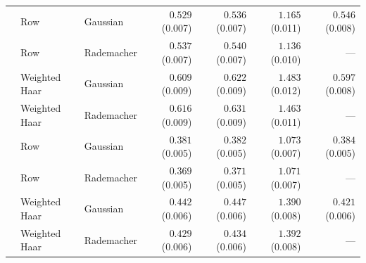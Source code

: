 \begin{tabular}{@{}rllrrrr@{}}
\addlinespace[3pt]
256 & Row & Gaussian & $0.529$ (0.007) & $0.536$ (0.007) & $1.165$ (0.011) & $0.546$ (0.008) \\
 & Row & Rademacher & $0.537$ (0.007) & $0.540$ (0.007) & $1.136$ (0.010) & --- \\
 & Weighted Haar & Gaussian & $0.609$ (0.009) & $0.622$ (0.009) & $1.483$ (0.012) & $0.597$ (0.008) \\
 & Weighted Haar & Rademacher & $0.616$ (0.009) & $0.631$ (0.009) & $1.463$ (0.011) & --- \\
\addlinespace[3pt]
512 & Row & Gaussian & $0.381$ (0.005) & $0.382$ (0.005) & $1.073$ (0.007) & $0.384$ (0.005) \\
 & Row & Rademacher & $0.369$ (0.005) & $0.371$ (0.005) & $1.071$ (0.007) & --- \\
 & Weighted Haar & Gaussian & $0.442$ (0.006) & $0.447$ (0.006) & $1.390$ (0.008) & $0.421$ (0.006) \\
 & Weighted Haar & Rademacher & $0.429$ (0.006) & $0.434$ (0.006) & $1.392$ (0.008) & --- \\
\bottomrule
\end{tabular}
